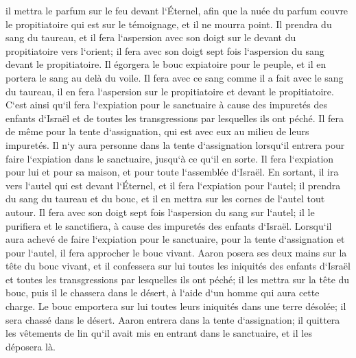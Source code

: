 \verse il mettra le parfum sur le feu devant l`Éternel, afin que la nuée du parfum couvre le propitiatoire qui est sur le témoignage, et il ne mourra point. 
\verse Il prendra du sang du taureau, et il fera l`aspersion avec son doigt sur le devant du propitiatoire vers l`orient; il fera avec son doigt sept fois l`aspersion du sang devant le propitiatoire. 
\verse Il égorgera le bouc expiatoire pour le peuple, et il en portera le sang au delà du voile. Il fera avec ce sang comme il a fait avec le sang du taureau, il en fera l`aspersion sur le propitiatoire et devant le propitiatoire. 
\verse C`est ainsi qu`il fera l`expiation pour le sanctuaire à cause des impuretés des enfants d`Israël et de toutes les transgressions par lesquelles ils ont péché. Il fera de même pour la tente d`assignation, qui est avec eux au milieu de leurs impuretés. 
\verse Il n`y aura personne dans la tente d`assignation lorsqu`il entrera pour faire l`expiation dans le sanctuaire, jusqu`à ce qu`il en sorte. Il fera l`expiation pour lui et pour sa maison, et pour toute l`assemblée d`Israël. 
\verse En sortant, il ira vers l`autel qui est devant l`Éternel, et il fera l`expiation pour l`autel; il prendra du sang du taureau et du bouc, et il en mettra sur les cornes de l`autel tout autour. 
\verse Il fera avec son doigt sept fois l`aspersion du sang sur l`autel; il le purifiera et le sanctifiera, à cause des impuretés des enfants d`Israël. 
\verse Lorsqu`il aura achevé de faire l`expiation pour le sanctuaire, pour la tente d`assignation et pour l`autel, il fera approcher le bouc vivant. 
\verse Aaron posera ses deux mains sur la tête du bouc vivant, et il confessera sur lui toutes les iniquités des enfants d`Israël et toutes les transgressions par lesquelles ils ont péché; il les mettra sur la tête du bouc, puis il le chassera dans le désert, à l`aide d`un homme qui aura cette charge. 
\verse Le bouc emportera sur lui toutes leurs iniquités dans une terre désolée; il sera chassé dans le désert. 
\verse Aaron entrera dans la tente d`assignation; il quittera les vêtements de lin qu`il avait mis en entrant dans le sanctuaire, et il les déposera là. 
